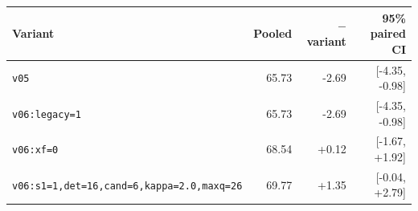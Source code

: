 \begin{tabular}{lrrr}
\toprule
Variant & Pooled & \vsix{} $-$ variant & 95\% paired CI \\
\midrule
\texttt{v05} & 65.73 & -2.69 & [-4.35, -0.98] \\
\texttt{v06:legacy=1} & 65.73 & -2.69 & [-4.35, -0.98] \\
\texttt{v06:xf=0} & 68.54 & +0.12 & [-1.67, +1.92] \\
\texttt{v06:s1=1,det=16,cand=6,kappa=2.0,maxq=26} & 69.77 & +1.35 & [-0.04, +2.79] \\
\bottomrule
\end{tabular}
